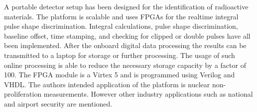 \documentclass[12pt]{article}
\begin{document}
\begin{doublespacing}
{\large\textbf{\cite{Schiffer2011491}}}
A portable detector setup has been designed for the identification of radioactive materials. The platform is scalable and uses FPGAs for the realtime integral pulse shape discrimination. Integral calculations, pulse shape discrimination, baseline offset, time stamping, and checking for clipped or double pulses have all been implemented. After the onboard digital data processing the results can be transmitted to a laptop for storage or further processing. The usage of such online processing is able to reduce the necessary storage capacity by a factor of 100. The FPGA module is a Virtex 5 and is programmed using Verilog and VHDL. The authors intended application of the platform is nuclear non-proliferation measurements. However other industry applications such as national and airport security are mentioned.
\\[20pt]


\end{doublespacing}



\end{document}
